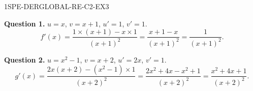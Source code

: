\begin{corrige}{1SPE-DERGLOBAL-RE-C2-EX3}

\textbf{Question 1.}
$u = x$, $v = x+1$, $u' = 1$, $v' = 1$.
\[
f'(x) = \frac{1 \times (x+1) - x \times 1}{(x+1)^2} = \frac{x + 1 - x}{(x+1)^2} = \frac{1}{(x+1)^2}.
\]

\textbf{Question 2.}
$u = x^2 - 1$, $v = x+2$, $u' = 2x$, $v' = 1$.
\[
g'(x) = \frac{2x(x+2) - (x^2-1) \times 1}{(x+2)^2} = \frac{2x^2 + 4x - x^2 + 1}{(x+2)^2} = \frac{x^2 + 4x + 1}{(x+2)^2}.
\]

\end{corrige}
